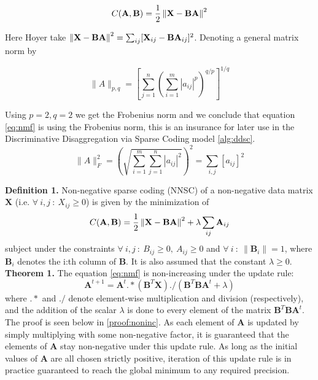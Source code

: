 \begin{equation}
\label{eq:nmf}
C ( \mathbf{A,B} ) = \frac{1}{2} \left\lVert \mathbf{X} - \mathbf{BA} \right\rVert^2
\end{equation}

Here Hoyer \cite{hoyer} take $ \left\lVert \mathbf{X} - \mathbf{BA} \right\rVert^2 = \sum_{ij} [ \mathbf{X}_{ij} - \mathbf{BA}_{ij} ]^2$. Denoting a general matrix norm by

\begin{equation}
\| A \|_{p,q}  =  \left[\sum_{j=1}^n \left( \sum_{i=1}^m |a_{ij}|^p \right)^{q/p}\right]^{1/q}
\end{equation}

Using $p=2,q = 2$ we get the Frobenius norm and we conclude that equation \ref{eq:nmf} is using the Frobenius norm, this is an insurance for later use in the Discriminative Disaggregation via Sparse Coding model \ref{alg:ddsc}.
\[ \|A\|_F^2 =\left(\sqrt{\sum_{i=1}^m\sum_{j=1}^n |a_{ij}|^2}\right)^2 = \sum_{i,j}[a_{ij}]^2\]


\textbf{Definition 1.} Non-negative sparse coding (NNSC) of a non-negative data matrix $\mathbf{X}$ (i.e. $\forall \ i,j \ : \ X_{ij} \geq 0$) is given by the minimization of
\begin{equation}
\label{eq:nnsc}
C ( \mathbf{A,B} ) = \frac{1}{2} \left\lVert \mathbf{X} - \mathbf{BA} \right\rVert^2 + \lambda \sum_{ij} \mathbf{A}_{ij}
\end{equation}
subject under the constraints $\forall \ i,j \ : \ B_{ij} \geq 0, \ A_{ij} \geq 0$ and $\forall \ i \ : \ \| \mathbf{B}_i \| = 1$, where $\mathbf{B}_i$ denotes the i:th column of $\mathbf{B}$. It is also assumed that the constant $\lambda \geq 0$. 
~\\

\pagebreak
\textbf{Theorem 1.} The equation \ref{eq:nmf} is non-increasing under the update rule:
\begin{equation}
\label{eq:update}
\mathbf{A}^{t+1}=\mathbf{A}^t.*(\mathbf{B}^T\mathbf{X})./(\mathbf{B}^T\mathbf{B}\mathbf{A}^t+\lambda)
\end{equation}
where $.*$ and $./$ denote element-wise multiplication and division (respectively), and the addition of the scalar $\lambda$ is done to every element of the matrix  $\mathbf{B}^T\mathbf{B}\mathbf{A}^t$.
~\\

The proof is seen below in \ref{proof:noninc}. As each element of $\mathbf{A}$ is updated by simply multiplying with some non-negative factor, it is guaranteed that the elements of $\mathbf{A}$ stay non-negative under this update rule. As long as the initial values of $\mathbf{A}$ are all chosen strictly positive, iteration of this update rule is in practice guaranteed to reach the global minimum to any required precision.

